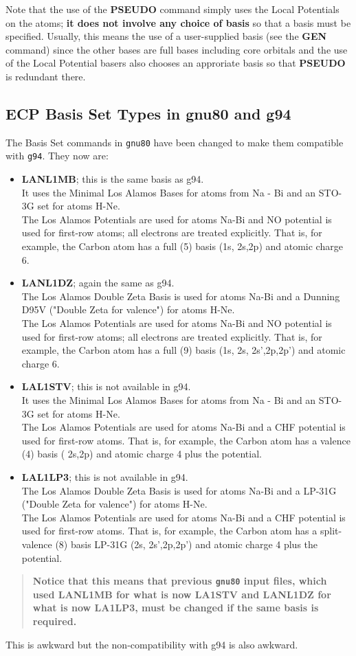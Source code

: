 Note that the use of the {\bf PSEUDO} command simply uses the
Local Potentials on the atoms; {\bf it does not involve any
choice of basis} so that a basis must be specified. Usually, this
means the use of a user-supplied basis (see the {\bf GEN} command)
since the other bases are full bases including core orbitals and
the use of the Local Potential basers also chooses an approriate
basis so that {\bf PSEUDO} is redundant there.
%
\subsection{\sf ECP Basis Set Types in gnu80 and g94}
The Basis Set commands in {\tt gnu80} have been changed to make
them compatible with {\tt g94}. They now are:
\begin{itemize}
\item
{\bf LANL1MB}; this is the same basis as g94. \\
It uses the Minimal Los Alamos Bases for atoms from Na - Bi and
an STO-3G set for atoms H-Ne. \\
The Los Alamos Potentials are used for atoms Na-Bi and NO potential
is used for first-row atoms; all electrons are treated explicitly.
That is, for example, the Carbon atom has a full (5) basis
(1s, 2s,2p) and atomic charge 6.
\item
{\bf LANL1DZ}; again the same as g94. \\
The Los Alamos Double Zeta Basis is used for atoms Na-Bi
and a Dunning D95V ("Double Zeta for valence") for atoms
H-Ne. \\
The Los Alamos Potentials are used for atoms Na-Bi and NO potential
is used for first-row atoms; all electrons are treated explicitly.
That is, for example, the Carbon atom has a full (9) basis
(1s, 2s, 2s',2p,2p') and atomic charge 6.
\item
{\bf LAL1STV}; this is not available in g94. \\
It uses the Minimal Los Alamos Bases for atoms from Na - Bi and
an STO-3G set for atoms H-Ne. \\
The Los Alamos Potentials are used for atoms Na-Bi and a CHF potential
is used for first-row atoms.
That is, for example, the Carbon atom has a valence (4) basis
( 2s,2p) and atomic charge 4 plus the potential.
\item
{\bf LAL1LP3}; this is not available in g94. \\
The Los Alamos Double Zeta Basis is used for atoms Na-Bi
and a LP-31G ("Double Zeta for valence") for atoms
H-Ne. \\
The Los Alamos Potentials are used for atoms Na-Bi and a CHF potential
is used for first-row atoms.
That is, for example, the Carbon atom has a split-valence (8) basis
LP-31G
(2s, 2s',2p,2p') and atomic charge 4 plus the potential.
\end{itemize}
\begin{quote}
{\bf Notice that this means that previous {\tt gnu80} input
files, which used LANL1MB for what is now LA1STV and
LANL1DZ for what is now LA1LP3, must be changed if the same
basis is required.}
\end{quote}
This is awkward but the non-compatibility with g94 is also
awkward.
%
